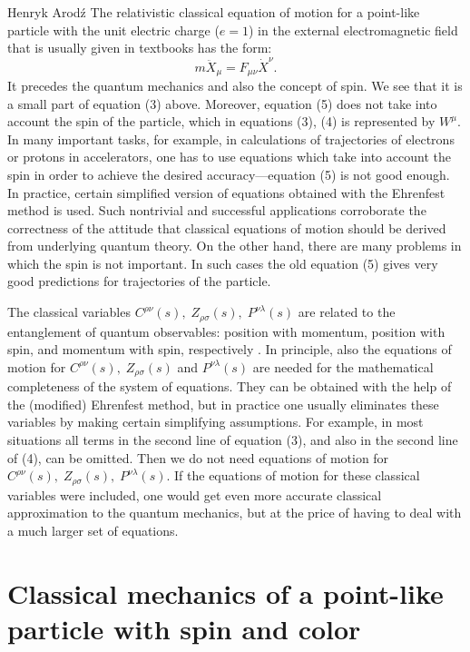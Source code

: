 \begin{artengenv}{Henryk Arod\'z}
The relativistic classical equation of motion for a point-like particle with the unit electric charge ($e=1$) in the external electromagnetic field that is usually given in textbooks has the form:
\begin{equation} m \ddot{X}_{\mu} = F_{\mu\nu}\dot{X}^{\nu}. \end{equation}
It precedes the quantum mechanics and also the concept of spin. We see that 
it is a small part of equation (3) above. Moreover, equation (5) does not take into account the spin of the particle, which in equations (3), (4) is represented by $W^{\mu}$. In many important tasks, for example, in calculations of trajectories of electrons or protons in accelerators, one has to use equations which take into account the spin in order to achieve the desired accuracy---equation (5) is not good enough. In practice, certain simplified version of equations obtained with the Ehrenfest method is used. Such nontrivial and successful applications corroborate the correctness of the attitude that classical equations of motion should be derived from underlying quantum theory. On the other hand, there are many problems in which the spin is not important. In such cases the old equation (5) gives very good predictions for trajectories of the particle. 






The classical variables $ C^{\rho\nu}(s), \;Z_{\rho\sigma}(s), \;P^{\nu\lambda}(s)$ are related to the entanglement of quantum observables: position with momentum, position with spin, and momentum with spin, respectively \parencite{aro1}. In principle, also the equations of motion for $ C^{\rho\nu}(s), \;Z_{\rho\sigma}(s)$ and $P^{\nu\lambda}(s)$ are needed for the mathematical completeness of the system of equations. They can be obtained with the help of the (modified) Ehrenfest method, but in practice one usually eliminates these variables by making certain simplifying assumptions. For example, in most situations all terms in the second line of equation (3), and also in the second line of (4), can be omitted. Then we do not need equations of motion for $ C^{\rho\nu}(s), \;Z_{\rho\sigma}(s), \;P^{\nu\lambda}(s)$. If the equations of motion for these classical variables were included, one would get even more accurate 
classical approximation to the quantum mechanics, but at the price of having to deal with a much larger set of equations. 



\section{Classical mechanics of a point-like particle with spin and color }



\end{artengenv}
